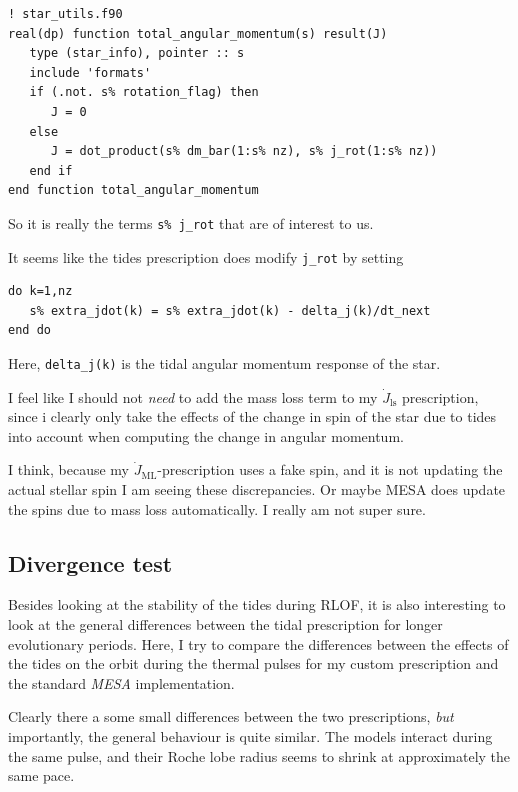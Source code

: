 \documentclass[a4paper,10pt]{article}
\begin{document}
\begin{verbatim}
! star_utils.f90
real(dp) function total_angular_momentum(s) result(J)
   type (star_info), pointer :: s
   include 'formats'
   if (.not. s% rotation_flag) then
      J = 0
   else
      J = dot_product(s% dm_bar(1:s% nz), s% j_rot(1:s% nz))
   end if
end function total_angular_momentum
\end{verbatim}
So it is really the terms \lstinline[style=output, breaklines=true]|s% j_rot| that are of interest to us.

It seems like the tides prescription does modify \lstinline[style=output, breaklines=true]|j_rot| by setting
\begin{verbatim}
do k=1,nz
   s% extra_jdot(k) = s% extra_jdot(k) - delta_j(k)/dt_next
end do
\end{verbatim}
Here, \lstinline[style=output, breaklines=true]|delta_j(k)| is the tidal angular momentum response of the star.

I feel like I should not \emph{need} to add the mass loss term to my \(\dot{J}_\text{ls}\) prescription, since i clearly only take the effects of the change in spin of the star due to tides into account when computing the change in angular momentum.

I think, because my \(\dot{J}_\text{ML}\)-prescription uses a fake spin, and it is not updating the actual stellar spin I am seeing these discrepancies.
Or maybe MESA does update the spins due to mass loss automatically. I really am not super sure.

\nextpage
\subsection{Divergence test}
Besides looking at the stability of the tides during RLOF, it is also interesting to look at the general differences between the tidal prescription for longer evolutionary periods. Here, I try to compare the differences between the effects of the tides on the orbit during the thermal pulses for my custom prescription and the standard \emph{MESA} implementation.

\begin{figure}[ht]
    \centering
\end{figure}

Clearly there a some small differences between the two prescriptions, \emph{but} importantly, the general behaviour is quite similar. The models interact during the same pulse, and their Roche lobe radius seems to shrink at approximately the same pace.
\end{document}

